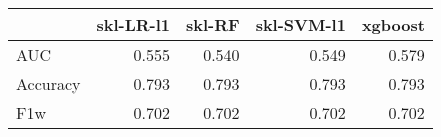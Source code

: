 \begin{tabular}{lrrrr}
\toprule
{} &  skl-LR-l1 &  skl-RF &  skl-SVM-l1 &  xgboost \\
\midrule
AUC      &      0.555 &   0.540 &       0.549 &    0.579 \\
Accuracy &      0.793 &   0.793 &       0.793 &    0.793 \\
F1w      &      0.702 &   0.702 &       0.702 &    0.702 \\
\bottomrule
\end{tabular}
